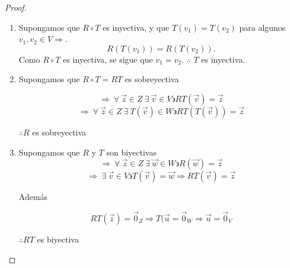 \documentclass[12pt]{article}
\begin{document}
\begin{proof}
        \begin{enumerate}
            \item Supongamos que \(R \circ T\) es inyectiva, y que \(T(v_1) = T(v_2)\) para algunos \(v_1, v_2 \in V \Rightarrow\). 
        \[
        R(T(v_1)) = R(T(v_2)).
        \]
        Como \(R \circ T\) es inyectiva, se sigue que \(v_1 = v_2\). $\therefore$ \(T\) es inyectiva.

        \item Supongamos que $R \circ T = RT$ es sobreyectiva

        $$\Rightarrow \: \forall \: \vec{z} \in Z \: \exists \: \vec{v} \in V \backepsilon RT(\vec{v}) = \vec{z}$$
         $$\Rightarrow \: \forall \: \vec{z} \in Z \: \exists \: T(\vec{v}) \in W \backepsilon RT(T(\vec{v})) = \vec{z}$$

         $\therefore R$ es sobreyectiva

         \item Supongamos que $R$ y $T$ son biyectivas
         $$\Rightarrow \: \forall \: \vec{z} \in Z \: \exists \: \vec{w} \in W \backepsilon R(\vec{w}) = \vec{z}$$
         $$\Rightarrow \: \exists \: \vec{v} \in V \backepsilon T(\vec{v}) = \vec{w} \Rightarrow  RT(\vec{v}) = \vec{z}$$

         Además

         $$RT(\vec{z}) = \vec{0}_Z \Rightarrow T(\vec{u} = \vec{0}_W \Rightarrow \vec{u} = \vec{0}_V $$

         $\therefore RT$ es biyectiva
        \end{enumerate}
    \end{proof}
\end{document}
